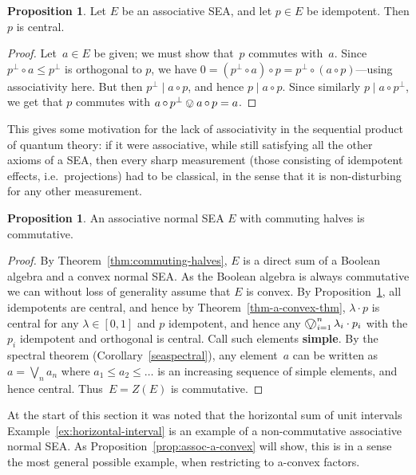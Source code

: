 \documentclass[a4paper, onecolumn, accepted=2020-12-22]{quantumarticle}
\newcommand\Define[1]{\textbf{#1}}
\newcommand{\mult}{\mathop{\circ}}
\newcommand{\commu}{\mathrel{\lvert}}
\newcommand{\bigovee}{\mathop{\vphantom{\sum}\mathchoice%
        {\vcenter{\hbox{\huge $\ovee$}}}%
        {\vcenter{\hbox{\Large $\ovee$}}}%
        {\ovee}{\ovee}}\displaylimits}
\newcounter{counter}
\theoremstyle{definition}
\newtheorem{proposition}[counter]{Proposition}
\begin{document}
\begin{proposition}\label{prop:assoc-is-commutative}
Let $E$ be an associative SEA, and let $p\in E$ be idempotent. 
Then $p$ is central.
\end{proposition}
\begin{proof}
Let~$a\in E$ be given;
we must show that~$p$ commutes with~$a$.
Since~$p^\perp\mult a\leq p^\perp$ is orthogonal to $p$,
we have $0 = (p^\perp\mult a)\mult p = p^\perp\mult (a\mult p)$---using
  associativity here.
  But then $p^\perp \commu a\mult p$, and hence $p\commu a\mult p$. 
Since similarly $p\commu a\mult p^\perp$,
  we get that $p$ commutes with $a\mult p^\perp \ovee a\mult p = a$. 
\end{proof}

This gives some motivation for the lack of associativity in the
sequential product of quantum theory: if it were associative, while
still satisfying all the other axioms of a SEA, then every sharp
measurement (those consisting of idempotent effects, i.e.~projections) had to be classical, in the sense that it is non-disturbing for any other measurement.

\begin{proposition}
  \label{prop-assoc-comm-halves}
An associative normal SEA $E$ with commuting halves is commutative.
\end{proposition}
\begin{proof}
    By Theorem~\ref{thm:commuting-halves}, $E$ is a direct sum of a Boolean algebra and a convex normal SEA. As the Boolean algebra is always commutative we can without loss of generality assume that $E$ is convex.
    By Proposition~\ref{prop:assoc-is-commutative}, all idempotents
    are central, and hence by Theorem~\ref{thm-a-convex-thm},
    $\lambda\cdot p$ is central for any $\lambda\in[0,1]$ and $p$
    idempotent, and hence any $\bigovee_{i=1}^n \lambda_i \cdot p_i$ with
    the $p_i$ idempotent and orthogonal is central. Call such
    elements \Define{simple}. By the spectral theorem (Corollary~\ref{seaspectral}), any
    element~$a$ can be written as $a=\bigvee_n a_n$ where $a_1\leq a_2\leq\ldots
    $ is an increasing sequence of simple elements,
    and hence central.  Thus~$E=Z(E)$ is commutative.
\end{proof}

At the start of this section it was noted that the horizontal sum of unit intervals Example~\ref{ex:horizontal-interval} is an example of a non-commutative associative normal SEA.
As Proposition~\ref{prop:assoc-a-convex} will show, this is in a sense the most general possible example, when restricting to a-convex factors.
\end{document}
